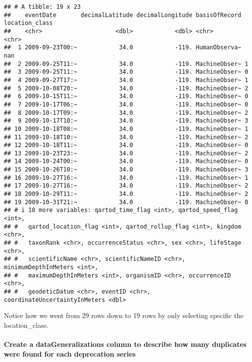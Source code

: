 \documentclass[
]{book}
\begin{document}
\begin{verbatim}
## # A tibble: 19 x 23
##    eventDate       decimalLatitude decimalLongitude basisOfRecord location_class
##    <chr>                     <dbl>            <dbl> <chr>         <chr>         
##  1 2009-09-23T00:~            34.0            -119. HumanObserva~ nan           
##  2 2009-09-25T11:~            34.0            -119. MachineObser~ 1             
##  3 2009-09-25T11:~            34.0            -119. MachineObser~ 0             
##  4 2009-09-27T17:~            34.0            -119. MachineObser~ 1             
##  5 2009-10-08T20:~            34.0            -119. MachineObser~ 2             
##  6 2009-10-15T11:~            34.0            -119. MachineObser~ 0             
##  7 2009-10-17T06:~            34.0            -119. MachineObser~ 0             
##  8 2009-10-17T09:~            34.0            -119. MachineObser~ 2             
##  9 2009-10-17T10:~            34.0            -119. MachineObser~ 3             
## 10 2009-10-18T08:~            34.0            -119. MachineObser~ 1             
## 11 2009-10-18T10:~            34.0            -119. MachineObser~ 2             
## 12 2009-10-18T11:~            34.0            -119. MachineObser~ 0             
## 13 2009-10-23T23:~            34.0            -119. MachineObser~ 2             
## 14 2009-10-24T00:~            34.0            -119. MachineObser~ 0             
## 15 2009-10-26T10:~            34.0            -119. MachineObser~ 3             
## 16 2009-10-27T16:~            34.0            -119. MachineObser~ 1             
## 17 2009-10-27T16:~            34.0            -119. MachineObser~ 2             
## 18 2009-10-29T11:~            34.0            -119. MachineObser~ 2             
## 19 2009-10-31T21:~            34.0            -119. MachineObser~ 0             
## # i 18 more variables: qartod_time_flag <int>, qartod_speed_flag <int>,
## #   qartod_location_flag <int>, qartod_rollup_flag <int>, kingdom <chr>,
## #   taxonRank <chr>, occurrenceStatus <chr>, sex <chr>, lifeStage <chr>,
## #   scientificName <chr>, scientificNameID <chr>, minimumDepthInMeters <int>,
## #   maximumDepthInMeters <int>, organismID <chr>, occurrenceID <chr>,
## #   geodeticDatum <chr>, eventID <chr>, coordinateUncertaintyInMeters <dbl>
\end{verbatim}

Notice how we went from 29 rows down to 19 rows by only selecting specific the location\_class.

\hypertarget{create-a-datageneralizations-column-to-describe-how-many-duplicates-were-found-for-each-deprecation-series}{%
\paragraph{Create a dataGeneralizations column to describe how many duplicates were found for each deprecation series}\label{create-a-datageneralizations-column-to-describe-how-many-duplicates-were-found-for-each-deprecation-series}}
\end{document}
